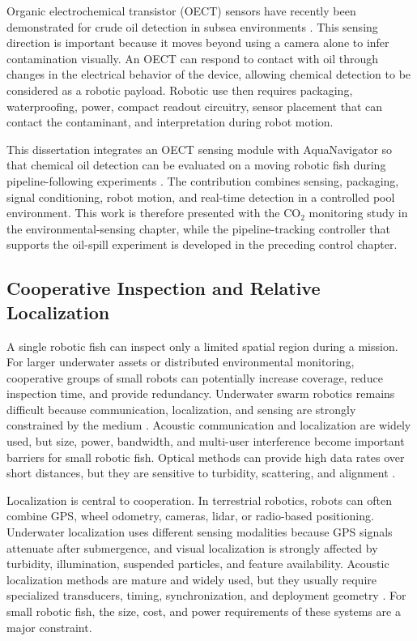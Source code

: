 \documentclass{uhcoethesis}
\begin{document}
Organic electrochemical transistor (OECT) sensors have recently been demonstrated for crude oil detection in subsea environments \cite{Porter2024}. This sensing direction is important because it moves beyond using a camera alone to infer contamination visually. An OECT can respond to contact with oil through changes in the electrical behavior of the device, allowing chemical detection to be considered as a robotic payload. Robotic use then requires packaging, waterproofing, power, compact readout circuitry, sensor placement that can contact the contaminant, and interpretation during robot motion.

This dissertation integrates an OECT sensing module with AquaNavigator so that chemical oil detection can be evaluated on a moving robotic fish during pipeline-following experiments \cite{Masood2026OilSpill}. The contribution combines sensing, packaging, signal conditioning, robot motion, and real-time detection in a controlled pool environment. This work is therefore presented with the \mbox{CO$_2$} monitoring study in the environmental-sensing chapter, while the pipeline-tracking controller that supports the oil-spill experiment is developed in the preceding control chapter.

\subsection{Cooperative Inspection and Relative Localization}

A single robotic fish can inspect only a limited spatial region during a mission. For larger underwater assets or distributed environmental monitoring, cooperative groups of small robots can potentially increase coverage, reduce inspection time, and provide redundancy. Underwater swarm robotics remains difficult because communication, localization, and sensing are strongly constrained by the medium \cite{Connor2021}. Acoustic communication and localization are widely used, but size, power, bandwidth, and multi-user interference become important barriers for small robotic fish. Optical methods can provide high data rates over short distances, but they are sensitive to turbidity, scattering, and alignment \cite{Partan2007}.

Localization is central to cooperation. In terrestrial robotics, robots can often combine GPS, wheel odometry, cameras, lidar, or radio-based positioning. Underwater localization uses different sensing modalities because GPS signals attenuate after submergence, and visual localization is strongly affected by turbidity, illumination, suspended particles, and feature availability. Acoustic localization methods are mature and widely used, but they usually require specialized transducers, timing, synchronization, and deployment geometry \cite{Luo2021,Su2020}. For small robotic fish, the size, cost, and power requirements of these systems are a major constraint.
\end{document}
